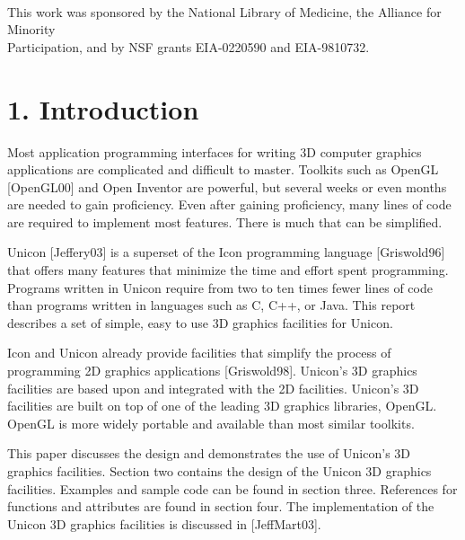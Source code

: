 \documentclass[letterpaper]{article}
\begin{document}
\ \\

\bigskip

\bigskip

\bigskip

\bigskip

\bigskip

\bigskip

{
This work was sponsored by the National Library of Medicine, the
Alliance for Minority\\ Participation, and by NSF grants
EIA-0220590 and EIA-9810732.}

\pagebreak

\section[1. Introduction]{1. Introduction}

\bigskip

Most application programming interfaces for writing 3D computer
graphics applications are complicated and difficult to
master. Toolkits such as OpenGL [OpenGL00] and Open Inventor are
powerful, but several weeks or even months are needed to gain
proficiency. Even after gaining proficiency, many lines of code are
required to implement most features. There is much that can be
simplified.

Unicon [Jeffery03] is a superset of the Icon programming language
[Griswold96] that offers many features that minimize the time and
effort spent programming. Programs written in Unicon require from two
to ten times fewer lines of code than programs written in languages
such as C, C++, or Java. This report describes a set of simple, easy
to use 3D graphics facilities for Unicon.

Icon and Unicon already provide facilities that simplify the process
of programming 2D graphics applications [Griswold98]. Unicon's 3D
graphics facilities are based upon and integrated with the 2D
facilities. Unicon's 3D facilities are built on top of one of the
leading 3D graphics libraries, OpenGL. OpenGL is more widely portable
and available than most similar toolkits.

This paper discusses the design and demonstrates the use of Unicon's
3D graphics facilities. Section two contains the design of the Unicon
3D graphics facilities. Examples and sample code can be found in
section three. References for functions and attributes are found in
section four. The implementation of the Unicon 3D graphics facilities
is discussed in [JeffMart03].
\end{document}
